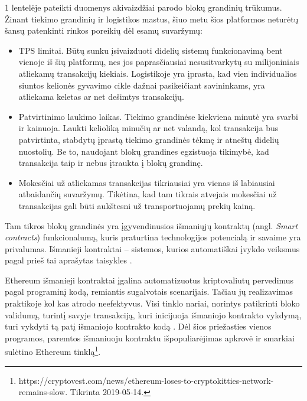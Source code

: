 1 lentelėje pateikti duomenys akivaizdžiai parodo blokų grandinių trūkumus. Žinant tiekimo grandinių ir logistikos mastus, šiuo metu šios platformos neturėtų šansų patenkinti rinkos poreikių dėl esamų suvaržymų: 
\begin{itemize}
    \item TPS limitai. Būtų sunku įsivaizduoti didelių sistemų funkcionavimą bent vienoje iš šių platformų, nes jos paprasčiausiai nesusitvarkytų su milijoniniais atliekamų transakcijų kiekiais. Logistikoje yra įprasta, kad vien individualios siuntos kelionės gyvavimo cikle dažnai pasikeičiant savininkams, yra atliekama keletas ar net dešimtys transakcijų.
    \item Patvirtinimo laukimo laikas. Tiekimo grandinėse kiekviena minutė yra svarbi ir kainuoja. Laukti kelioliką minučių ar net valandą, kol transakcija bus patvirtinta, stabdytų įprastą tiekimo grandinės tėkmę ir atneštų didelių nuostolių. Be to, naudojant blokų grandines egzistuoja tikimybė, kad transakcija taip ir nebus įtraukta į blokų grandinę.
    \item Mokesčiai už atliekamas transakcijas tikriausiai yra vienas iš labiausiai atbaidančių suvaržymų. Tikėtina, kad tam tikrais atvejais mokesčiai už transakcijas gali būti aukštesni už transportuojamų prekių kainą.
\end{itemize} 

Tam tikros blokų grandinės yra įgyvendinusios išmaniųjų kontraktų (angl. \textit{Smart contracts}) funkcionalumą, kuris praturtina technologijos potencialą ir savaime yra privalumas. Išmanieji kontraktai – sistemos, kurios automatiškai įvykdo veiksmus pagal prieš tai aprašytas taisykles \cite{buterin2013ethereum}.

Ethereum išmanieji kontraktai įgalina automatizuotus kriptovaliutų pervedimus pagal programinį kodą, remiantis sugalvotais scenarijais. Tačiau jų realizavimas praktikoje kol kas atrodo neefektyvus. Visi tinklo nariai, norintys patikrinti bloko validumą, turintį savyje transakciją, kuri inicijuoja išmaniojo kontrakto vykdymą, turi vykdyti tą patį išmaniojo kontrakto kodą \cite{buterin2013ethereum}. Dėl šios priežasties vienos programos, paremtos išmaniuoju kontraktu išpopuliarėjimas apkrovė ir smarkiai sulėtino Ethereum tinklą\footnote{https://cryptovest.com/news/ethereum-loses-to-cryptokitties-network-remains-slow. Tikrinta 2019-05-14.}.




